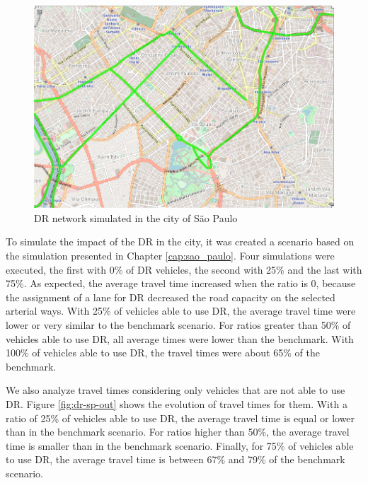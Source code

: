 \begin{figure}[!htb]
\centering
\includegraphics[width=1\textwidth]{figuras/chap-uses/proposal.png}
\caption{DR network simulated in the city of São Paulo}
\label{fig:dr_network}
\end{figure}

To simulate the impact of the DR in the city, it was created a scenario based on the simulation presented in Chapter \ref{cap:sao_paulo}. Four simulations were executed, the first with 0\% of DR vehicles, the second with 25\% and the last with 75\%. As expected, the average travel time increased when the ratio is 0, because the assignment of a lane for DR decreased the road capacity on the selected arterial ways. 
With 25\% of vehicles able to use DR, the average travel time were lower or very similar to the benchmark scenario. For ratios greater than 50\% of vehicles able to use DR, all average times were lower than the benchmark. With 100\% of vehicles able to use DR, the travel times were about 65\% of the benchmark.

We also analyze travel times considering only vehicles that are not able to use DR. Figure \ref{fig:dr-sp-out} shows the evolution of travel times for them. With a ratio of 25\% of vehicles able to use DR, the average travel time is equal or lower than in the benchmark scenario. For ratios higher than 50\%, the average travel time is smaller than in the benchmark scenario. Finally, for 75\% of vehicles able to use DR, the average travel time is between 67\% and 79\% of the benchmark scenario.